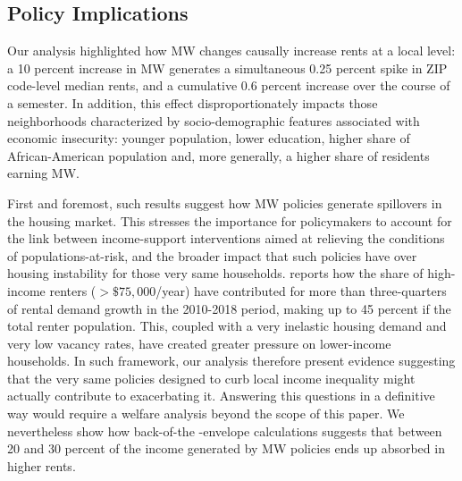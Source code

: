 \subsection{Policy Implications}\label{sec:policy}

Our analysis highlighted how MW changes causally increase rents at a local level: a 10 percent
increase in MW generates a simultaneous 0.25 percent spike in ZIP code-level median rents, and 
a cumulative 0.6 percent increase over the course of a semester. In addition, this effect 
disproportionately impacts those neighborhoods characterized by socio-demographic
features associated with economic insecurity: younger population, lower education, 
higher share of African-American population and, more generally, a higher share of residents 
earning MW. 

First and foremost, such results suggest how MW policies generate spillovers in the housing market. 
This stresses the importance for policymakers to account for the link between 
income-support interventions aimed at relieving the conditions of populations-at-risk, 
and the broader impact that such policies have over housing instability for those very same households.
\textcite{fernald2020americas} reports how the share of high-income renters ($>\$75,000$/year) have contributed for more
than three-quarters of rental demand growth in the 2010-2018 period, making up to 45 percent 
if the total renter population. This, coupled with a very inelastic housing demand and very low 
vacancy rates, have created greater pressure on lower-income households. In such framework, our analysis 
therefore present evidence suggesting that the very same policies designed to curb local income inequality
might actually contribute to exacerbating it. Answering this questions in a definitive way 
would require a welfare analysis beyond the scope of this paper. We nevertheless show how back-of-the
-envelope calculations suggests that between 20 and 30 percent of the income generated by MW policies 
ends up absorbed in higher rents.

